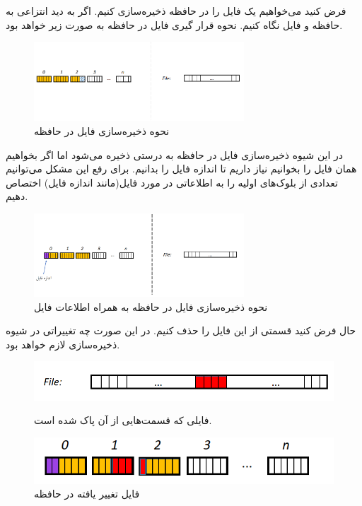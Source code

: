 \begin{flushright}
    فرض کنید می‌خواهیم یک فایل را در حافظه ذخیره‌سازی کنیم.
    اگر به دید انتزاعی به حافظه و فایل نگاه کنیم.
    نحوه قرار گیری فایل در حافظه به صورت زیر خواهد بود.

    \begin{figure}[H]
        \centering
        \includegraphics[width=0.7\textwidth]{source/file-in-memory-model-1}
        \caption{نحوه ذخیره‌سازی فایل در حافظه}
        \label{fig:file-in-memory-model-1}
    \end{figure}

    در این شیوه ذخیره‌سازی فایل در حافظه به درستی ذخیره می‌شود اما اگر بخواهیم همان فایل را بخوانیم نیاز داریم تا اندازه فایل را بدانیم.
    برای رفع این مشکل می‌توانیم تعدادی از بلوک‌های اولیه را به اطلاعاتی در مورد فایل(مانند اندازه فایل) اختصاص دهیم.

    \begin{figure}[H]
        \centering
        \includegraphics[width=0.7\textwidth]{source/file-in-memory-model-2}
        \caption{نحوه ذخیره‌سازی فایل در حافظه به همراه اطلاعات فایل}
        \label{fig:file-in-memory-model-2}
    \end{figure}

    حال فرض کنید قسمتی از این فایل را حذف کنیم.
    در این صورت چه تغییراتی در شیوه ذخیره‌سازی لازم خواهد بود.

    \begin{figure}[H]
        \includegraphics[width=\linewidth]{source/file-deleted-parts}
        \caption{فایلی که قسمت‌هایی از آن پاک شده است.}\label{fig:file-deleted-parts}
        \endminipage\hfill
        \includegraphics[width=\linewidth]{source/file-in-memory-model-3}
        \caption{فایل تغییر یافته در حافظه}\label{fig:file-in-memory-model-3}
        \endminipage\hfill
    \end{figure}


\end{flushright}
